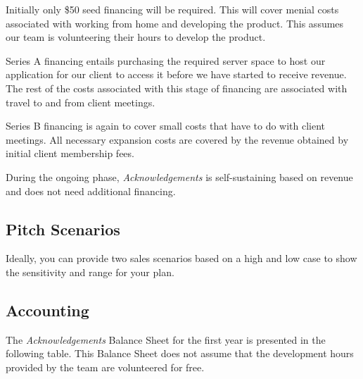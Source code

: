 Initially only \$50 seed financing will be required. This will cover menial costs associated with working from home and developing the product. This assumes our team is volunteering their hours to develop the product.

Series A financing entails purchasing the required server space to host our application for our client to access it before we have started to receive revenue. The rest of the costs associated with this stage of financing are associated with travel to and from client meetings.

Series B financing is again to cover small costs that have to do with client meetings. All necessary expansion costs are covered by the revenue obtained by initial client membership fees.

During the ongoing phase, {\it Acknowledgements} is self-sustaining based on revenue and does not need additional financing.

\subsection{Pitch Scenarios}
Ideally, you can provide two sales scenarios
based on a high and low case to show the sensitivity and range for your plan.

\subsection{Accounting}
The {\it Acknowledgements} Balance Sheet for the first year is presented in the following table. This Balance Sheet does not assume that the development hours provided by the team are volunteered for free.

